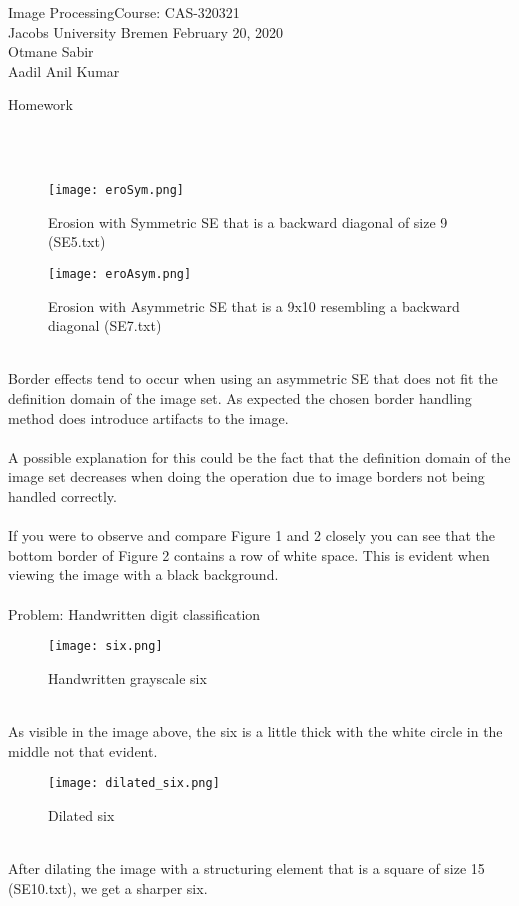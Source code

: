 \documentclass[a4paper]{article}
\newcommand{\coursename}{Image Processing}
\newcommand{\courseno}{CAS-320321}
\newcommand{\sheettitle}{Homework}
\newcommand{\mytoday}{{February 20}, 2020}
\newcounter{assignmentno}
\newcommand{\assignment}{\arabic{assignmentno}}
\begin{document}
\coursename \hfill Course: \courseno\\
Jacobs University Bremen \hfill \mytoday\\
{Otmane Sabir}\hfill \\
{Aadil Anil Kumar}\hfill
\vspace*{0.3cm}\\
\begin{center}
{\Large \sheettitle{} {\assignment}\\}
\end{center}
\\
\large{} \\ 
\begin{figure}[htp]
    \centering
    \texttt{[image: eroSym.png]}
    \caption{Erosion with Symmetric SE that is a backward diagonal of size 9 (SE5.txt)}
    \label{fig:erosionSym}
\end{figure}
\begin{figure}[htp]
    \centering
    \texttt{[image: eroAsym.png]}
    \caption{Erosion with Asymmetric SE that is a 9x10 resembling a backward diagonal (SE7.txt)}
    \label{fig:erosionAsym}
\end{figure} \\
Border effects tend to occur when using an asymmetric SE that does not fit the definition domain of the image set.
As expected the chosen border handling method does introduce artifacts to the image.\\ \\
A possible explanation for this could be the fact that the definition domain of the image set decreases when doing the operation due to image borders not being handled correctly.\\ \\
If you were to observe and compare Figure 1 and 2 closely you can see that the bottom border of Figure 2 contains a row of white space. This is evident when viewing the image with a black background. \\

\newpage
\large{} \\ 

Problem: Handwritten digit classification \\
\begin{figure}[htp]
    \centering
    \texttt{[image: six.png]}
    \caption{Handwritten grayscale six}
    \label{fig:erosionSym}
\end{figure}\\
As visible in the image above, the six is a little thick with the white circle in the middle not that evident.
\begin{figure}[htp]
    \centering
    \texttt{[image: dilated\_six.png]}
    \caption{Dilated six}
    \label{fig:erosionAsym}
\end{figure}\\
After dilating the image with a structuring element that is a square of size 15 (SE10.txt), we get a sharper six.\\
\end{document}
